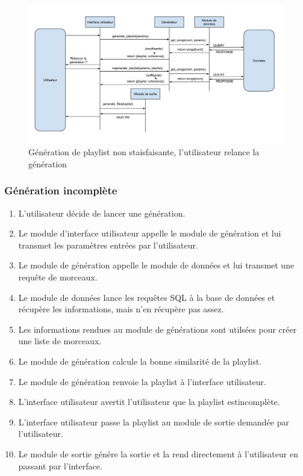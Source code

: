 \documentclass[11pt,a4paper]{article}
\begin{document}
\begin{figure}[!h]
\includegraphics[width=14cm]{generation_decevante.png}
\caption{Génération de playlist non staisfaisante, l'utilisateur relance la génération}
\end{figure}
 

\subsubsection{Génération incomplète}

\begin{enumerate}
\item L'utilisateur décide de lancer une génération.
\item Le module d'interface utilisateur appelle le module de génération et lui
transmet les paramètres entrées par l'utilisateur.
\item Le module de génération appelle le module de données et lui transmet une
requête de morceaux.
\item Le module de données lance les requêtes SQL à la base de données et
récupère les informations, mais n'en récupère pas assez.
\item Les informations rendues au module de générations sont utilsées pour créer
une liste de morceaux.
\item Le module de génération calcule la bonne similarité de la playlist.
\item Le module de génération renvoie la playlist à l'interface utilisateur.
\item L'interface utilisateur avertit l'utilisateur que la playlist estincomplète.
\item L'interface utilisateur passe la playlist au module de sortie demandée
par l'utilisateur.
\item Le module de sortie génére la sortie et la rend directement à
l'utilisateur en passant par l'interface.
\end{enumerate}
\end{document}
